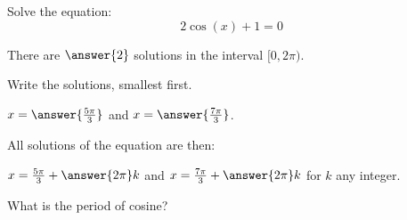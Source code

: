 \documentclass{ximera}
\author{Bobby Ramsey}
\begin{document}
\begin{exercise}

	Solve the equation:
	 \[2\cos(x) + 1 = 0\]
	
	There are $\answer{2}$ solutions in the interval $[0, 2\pi)$.	
	\begin{exercise}
		Write the solutions, smallest first.
		
		$x = \answer{\frac{5\pi}{3}}$ and $x = \answer{\frac{7\pi}{3}}$.
		\begin{exercise}
			All solutions of the equation are then:
			
			$x = \frac{5 \pi}{3} + \answer{2\pi} k$ and $x=\frac{7\pi}{3} + \answer{2\pi} k$ for $k$ any integer.
			\begin{hint}
				What is the period of cosine?
			\end{hint}
		\end{exercise}

	\end{exercise}

\end{exercise}
\end{document}
